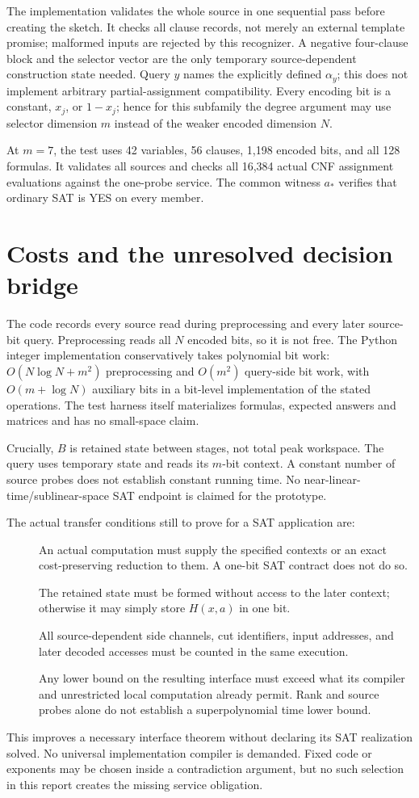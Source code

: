 \documentclass[11pt]{article}
\begin{document}
The implementation validates the whole source in one sequential pass before
creating the sketch. It checks all clause records, not merely an external
template promise; malformed inputs are rejected by this recognizer. A
negative four-clause block and the selector vector are the only temporary
source-dependent construction state needed. Query $y$ names the explicitly
defined $\alpha_y$; this does not implement arbitrary partial-assignment
compatibility. Every encoding bit is a constant, $x_j$, or $1-x_j$; hence
for this subfamily the degree argument may use selector dimension $m$
instead of the weaker encoded dimension $N$.

At $m=7$, the test uses 42 variables, 56 clauses, 1,198 encoded bits, and all
128 formulas. It validates all sources and checks all 16,384 actual CNF
assignment evaluations against the one-probe service. The common witness
$a_*$ verifies that ordinary SAT is YES on every member.

\section{Costs and the unresolved decision bridge}
The code records every source read during preprocessing and every later
source-bit query. Preprocessing reads all $N$ encoded bits, so it is not
free. The Python integer implementation conservatively takes polynomial
bit work: $O(N\log N+m^2)$ preprocessing and $O(m^2)$ query-side bit work,
with $O(m+\log N)$ auxiliary bits in a bit-level implementation of the
stated operations. The test harness itself materializes formulas, expected
answers and matrices and has no small-space claim.

Crucially, $B$ is retained state between stages, not total peak workspace.
The query uses temporary state and reads its $m$-bit context. A constant
number of source probes does not establish constant running time. No
near-linear-time/sublinear-space SAT endpoint is claimed for the prototype.

The actual transfer conditions still to prove for a SAT application are:
\begin{description}
\item[] An actual computation must supply the specified contexts or an exact
cost-preserving reduction to them. A one-bit SAT contract does not do so.
\item[] The retained state must be formed without access to the later context;
otherwise it may simply store $H(x,a)$ in one bit.
\item[] All source-dependent side channels, cut identifiers, input addresses,
and later decoded accesses must be counted in the same execution.
\item[] Any lower bound on the resulting interface must exceed what its
compiler and unrestricted local computation already permit. Rank and source
probes alone do not establish a superpolynomial time lower bound.
\end{description}
This improves a necessary interface theorem without declaring its SAT
realization solved. No universal implementation compiler is demanded.
Fixed code or exponents may be chosen inside a contradiction argument, but
no such selection in this report creates the missing service obligation.
\end{document}
